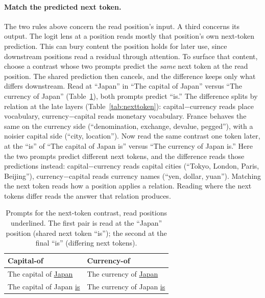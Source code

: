 \documentclass[11pt]{article}
\begin{document}
\paragraph{Match the predicted next token.} The two rules above concern the
read position's input. A third concerns its output. The logit lens at a position
reads mostly that position's own next-token prediction. This can bury content
the position holds for later use, since downstream positions read a residual
through attention. To surface that content, choose a contrast whose two prompts
predict the \emph{same} next token at the read position. The shared prediction
then cancels, and the difference keeps only what differs downstream. Read at
``Japan'' in ``The capital of Japan'' versus ``The currency of Japan''
(Table~\ref{tab:nexttoken-prompts}), both prompts predict ``is.'' The difference splits by relation at the late layers
(Table~\ref{tab:nexttoken}): capital$-$currency reads place vocabulary,
currency$-$capital reads monetary vocabulary. France behaves the same on the
currency side (``denomination, exchange, devalue, pegged''), with a noisier
capital side (``city, location''). Now read the same contrast one token later,
at the ``is'' of ``The capital of Japan is'' versus ``The currency of Japan
is.'' Here the two prompts predict different next tokens, and the difference
reads those predictions instead: capital$-$currency reads capital cities
(``Tokyo, London, Paris, Beijing''), currency$-$capital reads currency names
(``yen, dollar, yuan''). Matching the next token reads how a position applies a
relation. Reading where the next tokens differ reads the answer that relation
produces.

\begin{table}[htbp]
\centering
\small
\begin{tabular}{@{}ll@{}}
\toprule
Capital-of & Currency-of \\
\midrule
The capital of \underline{Japan}     & The currency of \underline{Japan} \\
The capital of Japan \underline{is}  & The currency of Japan \underline{is} \\
\bottomrule
\end{tabular}
\caption{Prompts for the next-token contrast, read positions underlined. The
first pair is read at the ``Japan'' position (shared next token ``is''); the
second at the final ``is'' (differing next tokens).}
\label{tab:nexttoken-prompts}
\end{table}
\end{document}
